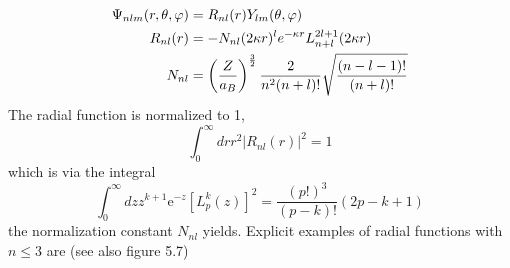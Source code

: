 \begin{align} 
    \Psi_{n l m}(r, \theta, \varphi) &=R_{n l}(r) Y_{l m}(\theta, \varphi) \\ 
    R_{n l}(r) &=-N_{n l}(2 \kappa r)^{l} e^{-\kappa r} L_{n+l}^{2 l+1}(2 \kappa r) \\
    N_{n l} &=\left(\frac{Z}{a_{B}}\right)^{\frac{3}{2}} \frac{2}{n^{2}(n+l) !} \sqrt{\frac{(n-l-1) !}{(n+l) !}}\notag
 \end{align}
The radial function is normalized to 1,
\begin{equation}
    \int_{0}^{\infty} d r r^{2}\left|R_{n l}(r)\right|^{2}=1
    \end{equation}
which is via the integral
\begin{equation}
    \int_{0}^{\infty} d z z^{k+1} \mathrm{e}^{-z}\left[L_{p}^{k}(z)\right]^{2}=\frac{(p !)^{3}}{(p-k) !}(2 p-k+1)
    \end{equation}
the normalization constant $N_{nl}$ yields. Explicit examples of radial functions with $n \leq 3$ are (see also figure 5.7)

